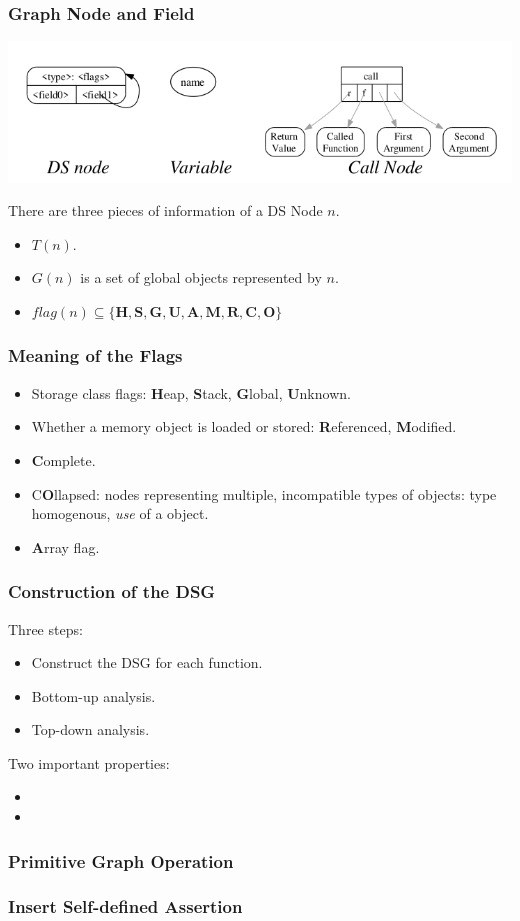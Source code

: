 \documentclass[aspectratio=1610, 13pt]{beamer}
\begin{document}
\begin{frame}\frametitle{Graph Node and Field}
\begin{center}
\includegraphics[scale=0.4]{dsg_legend.png}
\end{center}
There are three pieces of information of a DS Node $n$.
\begin{itemize}
\item $T(n)$.
\item $G(n)$ is a set of global objects represented by $n$.
\item $flag(n)\subseteq \{\mathbf{H,S,G,U,A,M,R,C,O}\}$
\end{itemize}
\end{frame}

\begin{frame}\frametitle{Meaning of the Flags}
\begin{itemize}
\item Storage class flags: \textbf{H}eap, \textbf{S}tack, \textbf{G}lobal, \textbf{U}nknown.

\item Whether a memory object is loaded or stored: \textbf{R}eferenced, \textbf{M}odified.

\item \textbf{C}omplete.
\item C\textbf{O}llapsed: nodes representing multiple, incompatible types of objects: type homogenous, \emph{use} of a object.
\item \textbf{A}rray flag.
\end{itemize}

\end{frame}

\begin{frame}\frametitle{Construction of the DSG}
Three steps:
\begin{itemize}
\item Construct the DSG for each function.
\item Bottom-up analysis.
\item Top-down analysis.

\end{itemize}
Two important properties:
\begin{itemize}
\item 
\item 
\end{itemize}
\end{frame}

\begin{frame}\frametitle{Primitive Graph Operation}

\end{frame}

\begin{frame}\frametitle{Insert Self-defined Assertion}

\end{frame}
\end{document}

